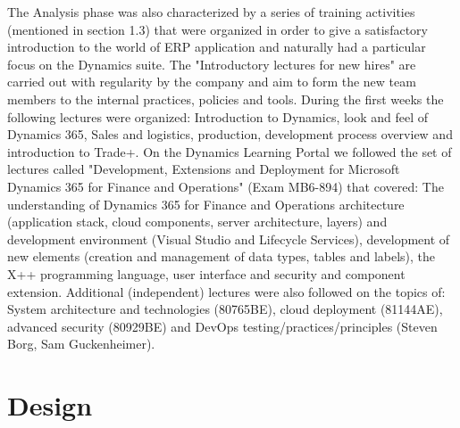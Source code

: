 The Analysis phase was also characterized by a series of training activities (mentioned in section 1.3) that were organized in order to give a satisfactory introduction to the world of ERP application and naturally had a particular focus on the Dynamics suite. The "Introductory lectures for new hires" are carried out with regularity by the company and aim to form the new team members to the internal practices, policies and tools. During the first weeks the following lectures were organized: Introduction to Dynamics, look and feel of Dynamics 365, Sales and logistics, production, development process overview and introduction to Trade+. On the Dynamics Learning Portal we followed the set of lectures called "Development, Extensions and Deployment for Microsoft Dynamics 365 for Finance and Operations" (Exam MB6-894) that covered: The understanding of Dynamics 365 for Finance and Operations architecture (application stack, cloud components, server architecture, layers) and development environment (Visual Studio and Lifecycle Services), development of new elements (creation and management of data types, tables and labels), the X++ programming language, user interface and security and component extension. Additional (independent) lectures were also followed on the topics of: System architecture and technologies (80765BE), cloud deployment (81144AE), advanced security (80929BE) and DevOps testing/practices/principles (Steven Borg, Sam Guckenheimer).

\section{Design} 

